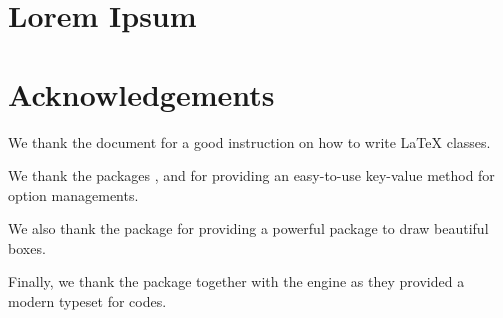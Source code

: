 \documentclass[showbib, lang=en]{DeanReport}
\begin{document}
\section{Lorem Ipsum}
\lipsum

\section{Acknowledgements}
    We thank the document \cite{clsguide} for a good instruction on how to write \LaTeX{} classes.

    We thank the packages ,  and  for providing an easy-to-use key-value method for option managements.

    We also thank the package  for providing a powerful package to draw beautiful boxes.

    Finally, we thank the package  together with the engine  as they provided a modern typeset for codes.
\end{document}
